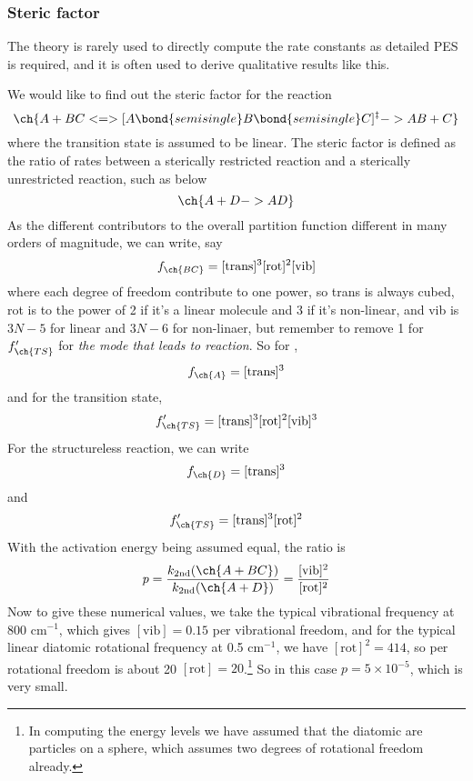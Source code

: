 \subsubsection{Steric factor}
The theory is rarely used to directly compute the rate constants as detailed PES is required, and it is often used to derive qualitative results like this.\par
We would like to find out the steric factor for the reaction
\begin{equation*}
  \ch{A + BC <=> [A\bond{semisingle}B\bond{semisingle}C]^{\ddag} -> AB + C}
\end{equation*}
where the transition state is assumed to be linear. The steric factor is defined as the ratio of rates between a sterically restricted reaction and a sterically unrestricted reaction, such as below
\begin{equation*}
  \ch{A + D -> AD}
\end{equation*}
As the different contributors to the overall partition function different in many orders of magnitude, we can write, say
\begin{equation}
  f_{\ch{BC}}=[\text{trans}]^3[\text{rot}]^2[\text{vib}]
\end{equation}
where each degree of freedom contribute to one power, so trans is always cubed, rot is to the power of 2 if it's a linear molecule and 3 if it's non-linear, and vib is $3N-5$ for linear and $3N-6$ for non-linaer, but remember to remove 1 for $f'_{\ch{TS}}$ for \emph{the mode that leads to reaction}. So for ,
\begin{equation}
  f_{\ch{A}}=[\text{trans}]^3
\end{equation}
and for the transition state,
\begin{equation}
  f_{\ch{TS}}'=[\text{trans}]^3[\text{rot}]^2[\text{vib}]^3
\end{equation}
For the structureless reaction, we can write
\begin{equation}
  f_{\ch{D}}=[\text{trans}]^3
\end{equation}
and 
\begin{equation}
  f'_{\ch{TS}}=[\text{trans}]^3[\text{rot}]^2
\end{equation}
With the activation energy being assumed equal, the ratio is
\begin{equation}
  p=\frac{k_{\text{2nd}}(\ch{A + BC})}{k_{\text{2nd}}(\ch{A + D})}=\frac{[\text{vib}]^2}{[\text{rot}]^2}
\end{equation}
Now to give these numerical values, we take the typical vibrational frequency at 800 cm$^{-1}$, which gives $[\text{vib}]=0.15$ per vibrational freedom, and for the typical linear diatomic rotational frequency at 0.5 cm$^{-1}$, we have $[\text{rot}]^2=414$, so per rotational freedom is about 20 \ie $[\text{rot}]=20$.\footnote{In computing the energy levels we have assumed that the diatomic are particles on a sphere, which assumes two degrees of rotational freedom already.} So in this case $p=5\times10^{-5}$, which is very small.\par
